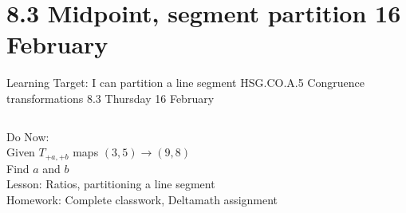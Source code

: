 \section{8.3 Midpoint, segment partition \hfill 16 February \,}
\begin{frame}{Learning Target: I can partition a line segment}
  {HSG.CO.A.5 Congruence transformations \hfill \alert{8.3 Thursday 16 February}}
  \begin{columns}
    Do Now: \\Given $T_{+a,+b}$ maps $(3,5) \rightarrow (9,8)$ \\
    Find $a$ and $b$ \\[0.5cm]
    Lesson: Ratios, partitioning a line segment \\
    Homework: Complete classwork, Deltamath assignment
    \begin{flushright}
    \end{flushright}
  \end{columns}
\end{frame}


